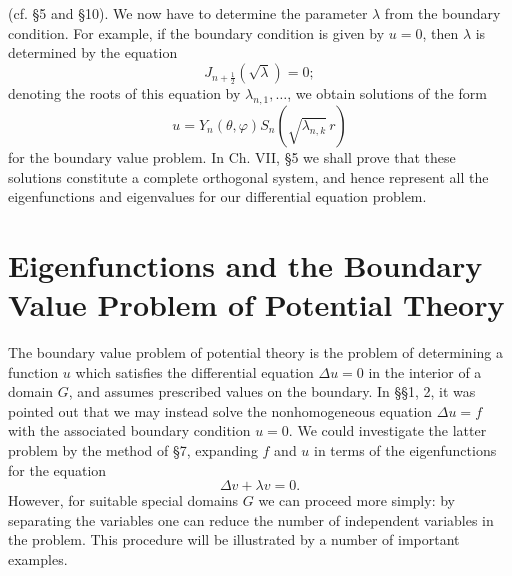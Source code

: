 (cf. \S5 and \S10). We now have to determine the parameter $\lambda$ from the boundary condition. For example, if the boundary condition is given by $u=0$, then $\lambda$ is determined by the equation
\[
J_{n+\frac12}(\sqrt\lambda)=0;
\]
denoting the roots of this equation by $\lambda_{n,1},\ldots$, we obtain solutions of the form
\[
u=Y_n(\theta,\varphi)S_n(\sqrt{\lambda_{n,k}}\,r)
\]
for the boundary value problem. In Ch. VII, \S5 we shall prove that these solutions constitute a complete orthogonal system, and hence represent all the eigenfunctions and eigenvalues for our differential equation problem.

\section{Eigenfunctions and the Boundary Value Problem of Potential Theory}
The boundary value problem of potential theory is the problem of determining a function $u$ which satisfies the differential equation $\Delta u=0$ in the interior of a domain $G$, and assumes prescribed values on the boundary. In \S\S1, 2, it was pointed out that we may instead solve the nonhomogeneous equation $\Delta u=f$ with the associated boundary condition $u=0$. We could investigate the latter problem by the method of \S7, expanding $f$ and $u$ in terms of the eigenfunctions for the equation
\[
\Delta v+\lambda v=0.
\]
However, for suitable special domains $G$ we can proceed more simply: by separating the variables one can reduce the number of independent variables in the problem. This procedure will be illustrated by a number of important examples.

